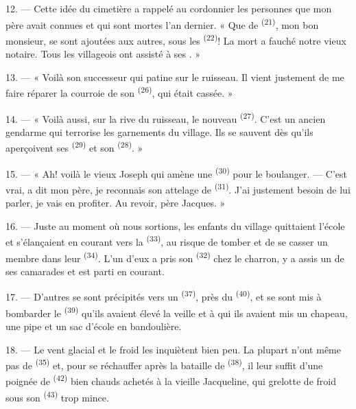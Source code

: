 12. --- Cette idée du cimetière a rappelé au cordonnier les personnes que mon
père avait connues et qui sont mortes l'an dernier. « Que de 
\textsuperscript{(21)}, mon bon monsieur, se sont ajoutées aux autres, sous les
 \textsuperscript{(22)}! La mort a fauché notre vieux notaire.
Tous les villageois ont assisté à ses . »

13. --- « Voilà son successeur qui patine sur le ruisseau. Il vient justement de
me faire réparer la courroie de son  \textsuperscript{(26)}, qui
était cassée. »

14. --- « Voilà aussi, sur la rive du ruisseau, le nouveau  \textsuperscript{(27)}. C'est un ancien gendarme qui terrorise les
garnements du village. Ils se sauvent dès qu'ils aperçoivent ses
 \textsuperscript{(29)} et son 
\textsuperscript{(28)}. »

15. --- « Ah! voilà le vieux Joseph qui amène une 
\textsuperscript{(30)} pour le boulanger. --- C'est vrai, a dit mon père, je
reconnais son attelage de  \textsuperscript{(31)}. J'ai justement
besoin de lui parler, je vais en profiter. Au revoir, père Jacques. »

16. --- Juste au moment où nous sortions, les enfants du village quittaient
l'école et s'élançaient en courant vers la 
\textsuperscript{(33)}, au risque de tomber et de se casser un membre dans leur
 \textsuperscript{(34)}. L'un d'eux a pris son 
\textsuperscript{(32)} chez le charron, y a assis un de ses camarades et est
parti en courant.

17. --- D'autres se sont précipités vers un 
\textsuperscript{(37)}, près du  \textsuperscript{(40)}, et se sont
mis à bombarder le  \textsuperscript{(39)} qu'ils
avaient élevé la veille et à qui ils avaient mis un chapeau, une pipe et un sac
d'école en bandoulière.

18. --- Le vent glacial et le froid les inquiètent bien peu. La plupart n'ont
même pas de  \textsuperscript{(35)} et, pour se réchauffer après
la bataille de  \textsuperscript{(38)}, il leur suffit
d'une poignée de  \textsuperscript{(42)} bien chauds achetés à
la vieille  Jacqueline, qui grelotte de froid sous son
 \textsuperscript{(43)} trop mince.

